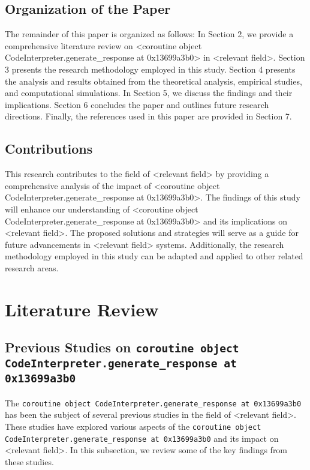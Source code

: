 \documentclass{article}
\begin{document}
\subsection{Organization of the Paper}
The remainder of this paper is organized as follows: In Section 2, we provide a comprehensive literature review on <coroutine object CodeInterpreter.generate_response at 0x13699a3b0> in <relevant field>. Section 3 presents the research methodology employed in this study. Section 4 presents the analysis and results obtained from the theoretical analysis, empirical studies, and computational simulations. In Section 5, we discuss the findings and their implications. Section 6 concludes the paper and outlines future research directions. Finally, the references used in this paper are provided in Section 7.

\subsection{Contributions}
This research contributes to the field of <relevant field> by providing a comprehensive analysis of the impact of <coroutine object CodeInterpreter.generate_response at 0x13699a3b0>. The findings of this study will enhance our understanding of <coroutine object CodeInterpreter.generate_response at 0x13699a3b0> and its implications on <relevant field>. The proposed solutions and strategies will serve as a guide for future advancements in <relevant field> systems. Additionally, the research methodology employed in this study can be adapted and applied to other related research areas.
\section{Literature Review}

\subsection{Previous Studies on \texttt{coroutine object CodeInterpreter.generate\_response at 0x13699a3b0}}

The \texttt{coroutine object CodeInterpreter.generate\_response at 0x13699a3b0} has been the subject of several previous studies in the field of <relevant field>. These studies have explored various aspects of the \texttt{coroutine object CodeInterpreter.generate\_response at 0x13699a3b0} and its impact on <relevant field>. In this subsection, we review some of the key findings from these studies.
\end{document}
